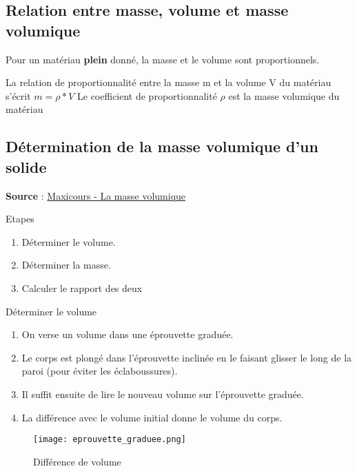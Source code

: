 \documentclass[a4paper,12pt]{article}
\begin{document}
\subsection*{Relation entre masse, volume et masse volumique}

Pour un matériau \textbf{plein} donné, la masse et le volume sont proportionnels. 

\begin{tcolorbox}
  La relation de proportionnalité entre la masse m et la volume V du matériau s'écrit
  \(m = \rho * V\)
  Le coefficient de proportionnalité \(\rho\) est la masse volumique du matériau
\end{tcolorbox}



\subsection*{Détermination de la masse volumique d'un solide}

\textbf{Source} : \href{https://www.maxicours.com/se/cours/determiner-une-masse-volumique-experimentalement--seconde--physique-chimie/}{Maxicours - La masse volumique}

Etapes 
\begin{enumerate}[noitemsep, label=(\arabic*)]
  \item Déterminer le volume.
  \item Déterminer la masse.
  \item Calculer le rapport des deux
\end{enumerate}

Déterminer le volume \par
\begin{enumerate}[noitemsep]
  \item On verse un volume dans une éprouvette graduée.
  \item Le corps est plongé dans l'éprouvette inclinée en le faisant glisser le long de la paroi (pour éviter les éclaboussures).
  \item Il suffit ensuite de lire le nouveau volume sur l'éprouvette graduée.
  \item La différence avec le volume initial donne le volume du corps.
\end{enumerate}

\begin{figure}[H]
  \centering
  \texttt{[image: eprouvette\_graduee.png]}
  \caption{\label{} Différence de volume}
\end{figure}
\end{document}

